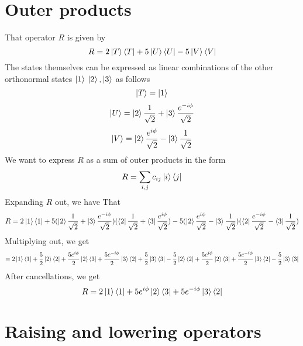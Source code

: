 \documentclass[12pt]{article}
\begin{document}
\section{Outer products}
That operator $R$ is given by
\begin{equation}
    R =2\ket{T}\bra{T}+5\ket{U}\bra{U}-5\ket{V}\bra{V}
\end{equation}
The states themselves can be expressed as linear combinations of the other orthonormal states $\ket{1}$ $\ket{2}, \ket{3}$ as follows
\begin{equation}
    \ket{T}= \ket{1}
\end{equation}
\begin{equation}
    \ket{U}= \ket{2}\frac{1}{\sqrt{2}}+\ket{3}\frac{e^{-i \phi}}{\sqrt{2}}
\end{equation}
\begin{equation}
    \ket{V}= \ket{2}\frac{e^{i \phi}}{\sqrt{2}}-\ket{3}\frac{1}{\sqrt{2}}
\end{equation}
We want to express $R$ as a sum of outer products in the form
\begin{equation}
    R = \sum_{i,j} c_{ij}\ket{i}\bra{j}
\end{equation}
Expanding $R$ out, we have That
\begin{equation}
    R = 2\ket{1}\bra{1}+5(\ket{2}\frac{1}{\sqrt{2}}+\ket{3}\frac{e^{-i \phi}}{\sqrt{2}})(\bra{2}\frac{1}{\sqrt{2}}+\bra{3}\frac{e^{i \phi}}{\sqrt{2}})-5(\ket{2}\frac{e^{i \phi}}{\sqrt{2}}-\ket{3}\frac{1}{\sqrt{2}})(\bra{2}\frac{e^{-i \phi}}{\sqrt{2}}-\bra{3}\frac{1}{\sqrt{2}})
\end{equation}
Multiplying out, we get
\begin{equation}
= 2\ket{1}\bra{1} + \frac{5}{2}\ket{2}\bra{2} + \frac{5e^{i\phi}}{2}\ket{2}\bra{3} + \frac{5e^{-i\phi}}{2}\ket{3}\bra{2} + \frac{5}{2}\ket{3}\bra{3}-\frac{5}{2}\ket{2}\bra{2} + \frac{5e^{i\phi}}{2}\ket{2}\bra{3} + \frac{5e^{-i\phi}}{2}\ket{3}\bra{2} - \frac{5}{2}\ket{3}\bra{3}
\end{equation}
After cancellations, we get
\begin{equation}
    R = 2\ket{1}\bra{1} + 5e^{i\phi}\ket{2}\bra{3} + 5e^{-i\phi}\ket{3}\bra{2}
\end{equation}
\section{Raising and lowering operators}
\subsection{}
\end{document}
